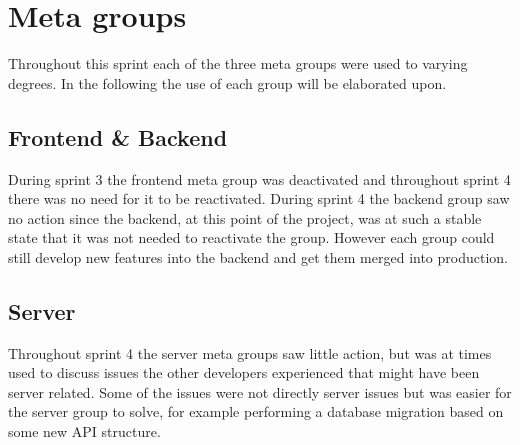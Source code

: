 \section{Meta groups}
Throughout this sprint each of the three meta groups were used to varying degrees. 
In the following the use of each group will be elaborated upon. 
 
\subsection{Frontend \& Backend}
During sprint 3 the frontend meta group was deactivated and throughout sprint 4 there was no need for it to be reactivated. 
During sprint 4 the backend group saw no action since the backend, at this point of the project, was at such a stable state that it was not needed to reactivate the group.
However each group could still develop new features into the backend and get them merged into production. 

\subsection{Server}
Throughout sprint 4 the server meta groups saw little action, but was at times used to discuss issues the other developers experienced that might have been server related. 
Some of the issues were not directly server issues but was easier for the server group to solve, for example performing a database migration based on some new API structure.



